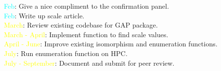 \documentclass[preview]{standalone}
\begin{document}
\textcolor{cyan}{Feb}: Give a nice compliment to the confirmation panel.\\\textcolor{cyan}{Feb}: Write up scale article.\\\textcolor{yellow}{March}: Review existing codebase for GAP package.\\\textcolor{yellow}{March - April}: Implement function to find scale values.\\\textcolor{yellow}{April - June}: Improve existing isomorphism and enumeration functions.\\\textcolor{yellow}{July}: Run enumeration function on HPC.\\\textcolor{yellow}{July - September}: Document and submit for peer review.\\
\end{document}
